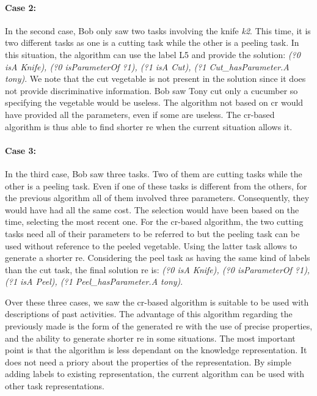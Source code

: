 \paragraph{Case 2:} In the second case, Bob only saw two tasks involving the knife \textit{k2}. This time, it is two different tasks as one is a cutting task while the other is a peeling task. In this situation, the algorithm can use the label L5 and provide the solution: \textit{(?0 isA Knife), (?0 isParameterOf ?1), (?1 isA Cut), (?1 Cut\_hasParameter.A tony)}. We note that the cut vegetable is not present in the solution since it does not provide discriminative information. Bob saw Tony cut only a cucumber so specifying the vegetable would be useless. The algorithm not based on \acrshort{cr} would have provided all the parameters, even if some are useless. The \acrshort{cr}-based algorithm is thus able to find shorter \acrshort{re} when the current situation allows it.

\paragraph{Case 3:} In the third case, Bob saw three tasks. Two of them are cutting tasks while the other is a peeling task. Even if one of these tasks is different from the others, for the previous algorithm all of them involved three parameters. Consequently, they would have had all the same cost. The selection would have been based on the time, selecting the most recent one. For the \acrshort{cr}-based algorithm, the two cutting tasks need all of their parameters to be referred to but the peeling task can be used without reference to the peeled vegetable. Using the latter task allows to generate a shorter \acrshort{re}. Considering the peel task as having the same kind of labels than the cut task, the final solution \acrshort{re} is: \textit{(?0 isA Knife), (?0 isParameterOf ?1), (?1 isA Peel), (?1 Peel\_hasParameter.A tony)}.

Over these three cases, we saw the \acrshort{cr}-based algorithm is suitable to be used with descriptions of past activities. The advantage of this algorithm regarding the previously made is the form of the generated \acrshort{re} with the use of precise properties, and the ability to generate shorter \acrshort{re} in some situations. The most important point is that the algorithm is less dependant on the knowledge representation. It does not need a priory about the properties of the representation. By simple adding labels to existing representation, the current algorithm can be used with other task representations.

